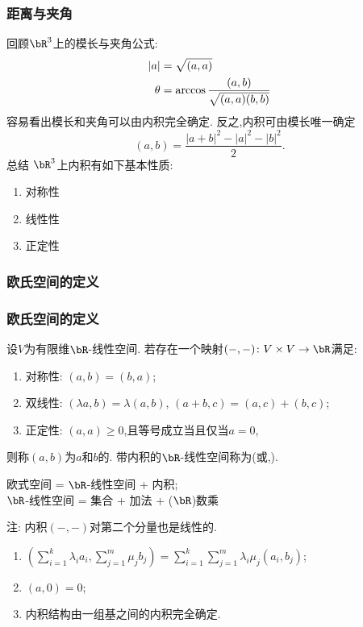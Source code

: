 \begin{frame}\frametitle{距离与夹角}
回顾$\bR^3$上的模长与夹角公式:
\pp
\begin{equation*}
\begin{split}
|a| & = \sqrt{(a,a)}\\
\pp
\theta & = \arccos\frac{(a,b)}{\sqrt{(a,a)(b,b)}}
\end{split}
\end{equation*}
\pp
容易看出模长和夹角可以由内积完全确定.
\pp
反之,内积可由模长唯一确定
\[(a,b)=\frac{|a+b|^2-|a|^2-|b|^2}{2}.\]
\pp
总结 $\bR^3$上内积有如下基本性质:
\begin{enumerate}
\item 对称性
\item 线性性
\item 正定性
\end{enumerate}
\pp
{}
\end{frame}








\subsubsection{欧氏空间的定义}
\begin{frame}\frametitle{欧氏空间的定义}
\begin{definition}[内积,欧氏空间]
\pp
设$V$为有限维$\bR$-线性空间.
\pp
若存在一个映射$(-,-)\colon V\times V \rightarrow \bR$满足:
\pp
\begin{enumerate}
\item 对称性: $(a,b)=(b,a)$;
\pp
\item 双线性: $(\lambda a,b)=\lambda(a,b)$, $(a+b,c)=(a,c)+(b,c)$;
\pp
\item 正定性: $(a,a)\geq0$,且等号成立当且仅当$a=0$,
\end{enumerate}
\pp
则称$(a,b)$为$a$和$b$的.
\pp 带内积的$\bR$-线性空间称为(或,).
\end{definition}
\pp
\begin{center}
欧式空间 = $\bR$-线性空间 + 内积;\\
$\bR$-线性空间 = 集合 + 加法 + ($\bR$)数乘\\
\end{center}
\pp
注: 内积$(-,-)$对第二个分量也是线性的.
\pp
\begin{proposition}[内积的基本性质]
\begin{enumerate}
\item $\left(\sum_{i=1}^{k}\lambda_ia_i,\sum_{j=1}^{m}\mu_jb_j\right) = \sum_{i=1}^{k}\sum_{j=1}^{m} \lambda_i\mu_j(a_i,b_j)$;
\pp
\item $(a,0)=0$;
\pp
\item 内积结构由一组基之间的内积完全确定.
\end{enumerate}
\end{proposition}
\end{frame}





